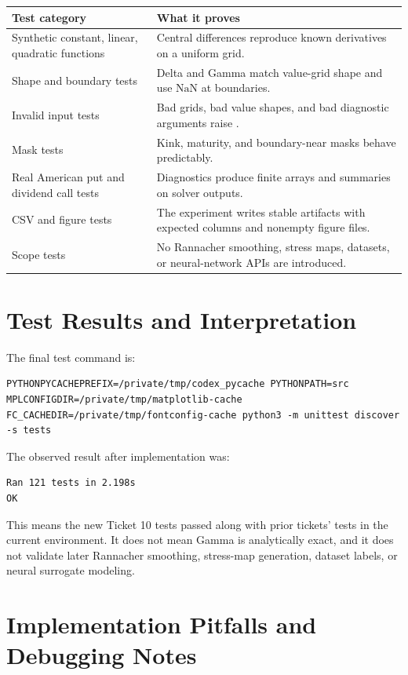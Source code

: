 \documentclass[11pt,a4paper]{article}
\begin{document}
\begin{longtable}{P{0.34\textwidth}L{0.45\textwidth}}
\toprule
Test category & What it proves \\
\midrule
\endhead
Synthetic constant, linear, quadratic functions & Central differences reproduce known derivatives on a uniform grid. \\
Shape and boundary tests & Delta and Gamma match value-grid shape and use \(\mathrm{NaN}\) at boundaries. \\
Invalid input tests & Bad grids, bad value shapes, and bad diagnostic arguments raise . \\
Mask tests & Kink, maturity, and boundary-near masks behave predictably. \\
Real American put and dividend call tests & Diagnostics produce finite arrays and summaries on solver outputs. \\
CSV and figure tests & The experiment writes stable artifacts with expected columns and nonempty figure files. \\
Scope tests & No Rannacher smoothing, stress maps, datasets, or neural-network APIs are introduced. \\
\bottomrule
\end{longtable}

\section{Test Results and Interpretation}

The final test command is:
\begin{lstlisting}
PYTHONPYCACHEPREFIX=/private/tmp/codex_pycache PYTHONPATH=src MPLCONFIGDIR=/private/tmp/matplotlib-cache FC_CACHEDIR=/private/tmp/fontconfig-cache python3 -m unittest discover -s tests
\end{lstlisting}

The observed result after implementation was:
\begin{lstlisting}
Ran 121 tests in 2.198s
OK
\end{lstlisting}

This means the new Ticket 10 tests passed along with prior tickets' tests in the current
environment. It does not mean Gamma is analytically exact, and it does not validate later
Rannacher smoothing, stress-map generation, dataset labels, or neural surrogate modeling.

\section{Implementation Pitfalls and Debugging Notes}
\end{document}

